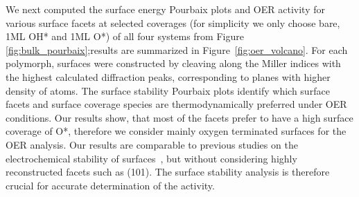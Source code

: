 %
%
We next computed the surface energy Pourbaix plots and OER activity for various surface facets at selected coverages (for simplicity we only choose bare, 1ML OH* and 1ML O*) of all four systems from Figure \ref{fig:bulk_pourbaix};results are summarized in Figure~\ref{fig:oer_volcano}.
%
%
For each polymorph, surfaces were constructed by cleaving along the Miller indices with the highest calculated diffraction peaks, corresponding to planes with higher density of atoms.
%
The surface stability Pourbaix plots identify which surface facets and surface coverage species are thermodynamically preferred under OER conditions.
%
Our results show, that most of the facets prefer to have a high surface coverage of O*, therefore we consider mainly oxygen terminated surfaces for the OER analysis.
%
Our results are comparable to previous studies on the electrochemical stability of \IrOtwo surfaces~\cite{Nattino2019,Raman2020},
but without considering highly reconstructed facets such as (101).
%
The surface stability analysis is therefore crucial for accurate determination of the activity.


